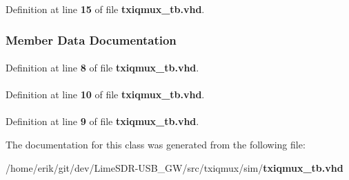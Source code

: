 Definition at line {\bf 15} of file {\bf txiqmux\+\_\+tb.\+vhd}.



\subsubsection{Member Data Documentation}
\paragraph[{ieee}]{\hspace{0.3cm}{\ttfamily [Library]}}\label{classtxiqmux__tb_a0a6af6eef40212dbaf130d57ce711256}


Definition at line {\bf 8} of file {\bf txiqmux\+\_\+tb.\+vhd}.

\paragraph[{numeric\+\_\+std}]{\hspace{0.3cm}{\ttfamily [Package]}}\label{classtxiqmux__tb_a2edc34402b573437d5f25fa90ba4013e}


Definition at line {\bf 10} of file {\bf txiqmux\+\_\+tb.\+vhd}.

\paragraph[{std\+\_\+logic\+\_\+1164}]{\hspace{0.3cm}{\ttfamily [Package]}}\label{classtxiqmux__tb_acd03516902501cd1c7296a98e22c6fcb}


Definition at line {\bf 9} of file {\bf txiqmux\+\_\+tb.\+vhd}.



The documentation for this class was generated from the following file\+:\begin{DoxyCompactItemize}
\item 
/home/erik/git/dev/\+Lime\+S\+D\+R-\/\+U\+S\+B\+\_\+\+G\+W/src/txiqmux/sim/{\bf txiqmux\+\_\+tb.\+vhd}\end{DoxyCompactItemize}
